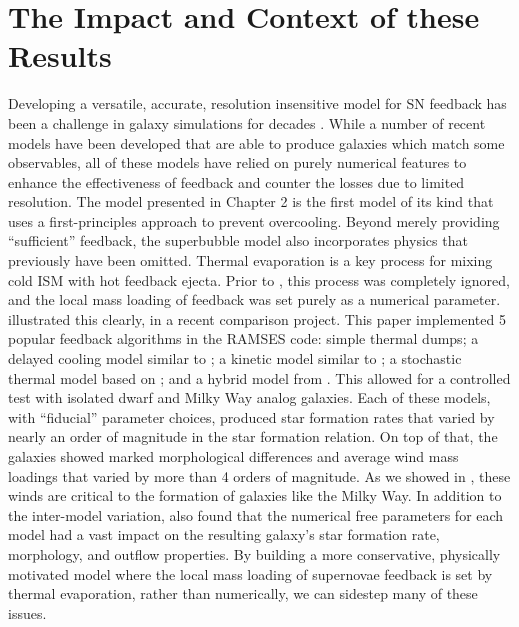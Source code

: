 \section{The Impact and Context of these Results}
Developing a versatile, accurate, resolution insensitive model for SN feedback
has been a challenge in galaxy simulations for decades \citep{Katz1992}.  While
a number of recent models have been developed that are able to produce galaxies
which match some observables, all of these models have relied on purely
numerical features to enhance the effectiveness of feedback and counter the
losses due to limited resolution.  The \citet{Keller2014} model presented in
Chapter 2 is the first model of its kind that uses a first-principles approach
to prevent overcooling.  Beyond merely providing ``sufficient'' feedback, the
superbubble model also incorporates physics that previously have been omitted.
Thermal evaporation is a key process for mixing cold ISM with hot feedback
ejecta.  Prior to \citet{Keller2014}, this process was completely ignored, and
the local mass loading of feedback was set purely as a numerical parameter.
\citet{Rosdahl2016} illustrated this clearly, in a recent comparison project.
This paper implemented 5 popular feedback algorithms in the {\sc RAMSES} code:
simple thermal dumps; a delayed cooling model similar to \citet{Agertz2013}; a
kinetic model similar to \citet{DallaVecchia2008}; a stochastic thermal model
based on \citet{DallaVecchia2012}; and a hybrid model from \citet{Kimm2015}.
This allowed for a controlled test with isolated dwarf and Milky Way analog
galaxies. Each of these models, with ``fiducial'' parameter choices, produced
star formation rates that varied by nearly an order of magnitude in the
\citet{Kennicutt1998} star formation relation.  On top of that, the galaxies
showed marked morphological differences and average wind mass loadings that
varied by more than 4 orders of magnitude.  As we showed in \citet{Keller2015},
these winds are critical to the formation of galaxies like the Milky Way.  In
addition to the inter-model variation, \citet{Rosdahl2016} also found that the
numerical free parameters for each model had a vast impact on the resulting
galaxy's star formation rate, morphology, and outflow properties.  By building a
more conservative, physically motivated model where the local mass loading of
supernovae feedback is set by thermal evaporation, rather than numerically, we
can sidestep many of these issues.

